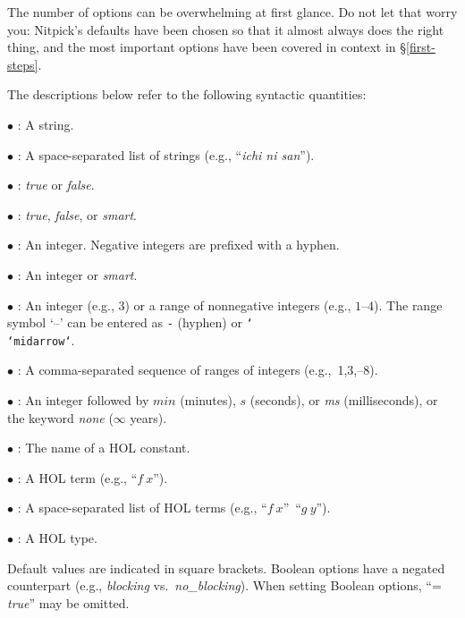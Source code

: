 \documentclass[a4paper,12pt]{article}
\begin{document}
The number of options can be overwhelming at first glance. Do not let that worry
you: Nitpick's defaults have been chosen so that it almost always does the right
thing, and the most important options have been covered in context in
\S\ref{first-steps}.

The descriptions below refer to the following syntactic quantities:

\begin{enum}
\item[$\bullet$] : A string.
\item[$\bullet$] : A space-separated list of strings
(e.g., ``\textit{ichi ni san}'').
\item[$\bullet$] : \textit{true} or \textit{false}.
\item[$\bullet$] : \textit{true}, \textit{false}, or \textit{smart}.
\item[$\bullet$] : An integer. Negative integers are prefixed with a hyphen.
\item[$\bullet$] : An integer or \textit{smart}.
\item[$\bullet$] : An integer (e.g., 3) or a range
of nonnegative integers (e.g., $1$--$4$). The range symbol `--' can be entered as \texttt{-} (hyphen) or \texttt{\char`\\\char`\<midarrow\char`\>}.

\item[$\bullet$] : A comma-separated sequence of ranges of integers (e.g.,~1{,}3{,}--8).
\item[$\bullet$] : An integer followed by $\textit{min}$ (minutes), $s$ (seconds), or \textit{ms}
(milliseconds), or the keyword \textit{none} ($\infty$ years).
\item[$\bullet$] : The name of a HOL constant.
\item[$\bullet$] : A HOL term (e.g., ``$f~x$'').
\item[$\bullet$] : A space-separated list of HOL terms (e.g.,
``$f~x$''~``$g~y$'').
\item[$\bullet$] : A HOL type.
\end{enum}

Default values are indicated in square brackets. Boolean options have a negated
counterpart (e.g., \textit{blocking} vs.\ \textit{no\_blocking}). When setting
Boolean options, ``= \textit{true}'' may be omitted.
\end{document}
